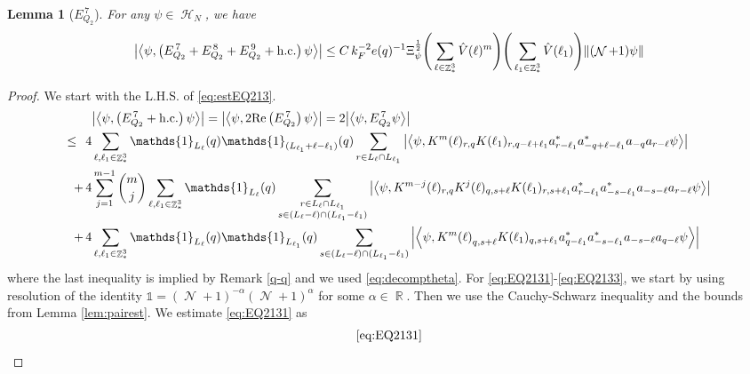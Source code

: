 \documentclass[sn-mathphys, Numbered ,a4paper]{sn-jnl}%
\DeclareMathOperator{\R}{\mathbb{R}}
\DeclareMathOperator{\Z}{\mathbb{Z}}
\DeclareMathOperator{\HH}{\mathcal{H}}
\DeclareMathOperator{\NN}{\mathcal{N}}
\newcommand{\half}{\frac{1}{2}}
\newcommand{\eva}[1]{\left\langle #1 \right\rangle}
\theoremstyle{plain}
\newtheorem{lemma}[theorem]{Lemma}
\theoremstyle{definition}
\theoremstyle{remark}
\theoremstyle{plain}
\theoremstyle{definition}
\theoremstyle{remark}
\begin{document}
\begin{lemma}[$E_{Q_2}^{\,7}$]\label{lem:EQ213}
	For any $\psi \in \HH_N$, we have
	\begin{equation}
		\abs{\eva{\psi,\left(E^{\,7}_{Q_2}+E^{\,8}_{Q_2}+E^{\,9}_{Q_2}+\mathrm{h.c.}\right) \psi }} 
		\leq  C\, k_{F}^{-2} e(q)^{-1} \Xi_{\psi}^{\half} \Bigg(\sum\limits_{\ell \in \Z^3_*} \hat{V}(\ell)^m \Bigg) \Bigg( \sum\limits_{\ell_1 \in \Z^3_*}\hat{V}(\ell_1) \Bigg)  \norm { (\NN+1) \psi }    \label{eq:estEQ213}
	\end{equation}
\end{lemma}
\begin{proof}
	We start with the L.H.S. of \eqref{eq:estEQ213}.
	\begin{align}
		&\abs{\eva{\psi,\left(E^{\,7}_{Q_2}+\mathrm{h.c.}\right) \psi }} = \abs{\eva{\psi,2\mathrm{Re}\left(E^{\,7}_{Q_2}\right) \psi }} = 2\abs{\eva{\psi, E^{\,7}_{Q_2} \psi }}\nonumber\\
		\leq\,\;4& \sum\limits_{\ell, \ell_1\in \Z^3_*} \mathds{1}_{L_{\ell}}(q) \mathds{1}_{(L_{\ell_1}+\ell-\ell_1)}(q) \sum\limits_{r\in L_{\ell} \cap L_{\ell_1}} \abs{\eva{\psi, K^m(\ell)_{r,q}K(\ell_1)_{r,q-\ell+\ell_1}a^*_{r-\ell_1}a^*_{-q+\ell-\ell_1} a_{-q}a_{r-\ell} \psi }}\label{eq:EQ2131}\\
		+\,4& \sum\limits_{j=1}^{m-1} {{m}\choose j} \sum\limits_{\ell, \ell_1\in \Z^3_*}\mathds{1}_{L_{\ell}}(q) \sum\limits_{\substack{r\in L_{\ell} \cap L_{\ell_1}\\ s \in (L_{\ell}-\ell) \cap (L_{\ell_1}-\ell_1)}}  \abs{\eva{\psi, K^{m-j}(\ell)_{r,q} K^{j}(\ell)_{q,s+\ell} K(\ell_1)_{r,s+\ell_1}a^*_{r-\ell_1}a^*_{-s-\ell_1} a_{-s-\ell}a_{r-\ell}  \psi }}\label{eq:EQ2132}\\
		+\,4&\sum\limits_{\ell, \ell_1\in \Z^3_*} \mathds{1}_{L_{\ell}}(q) \mathds{1}_{L_{\ell_1}}(q) \sum\limits_{ s \in (L_{\ell}-\ell) \cap (L_{\ell_1}-\ell_1)} \abs{\eva{\psi, K^m{(\ell)}_{q,s+\ell} K(\ell_1)_{q,s+\ell_1} a^*_{q-\ell_1} a^*_{-s-\ell_1} a_{-s-\ell} a_{q-\ell} \psi }}\label{eq:EQ2133}
	\end{align}
	where the last inequality is implied by Remark \ref{q-q} and we used \eqref{eq:decomptheta}.
	For \eqref{eq:EQ2131}-\eqref{eq:EQ2133}, we start by using resolution of the identity $\mathds{1} = (\NN+1)^{-\alpha}(\NN+1)^{\alpha}$ for some $\alpha \in \R$. Then we use the Cauchy-Schwarz inequality and the bounds from Lemma \ref{lem:pairest}.
	We estimate \eqref{eq:EQ2131} as
	\begin{alignat}{2}
		&\eqref{eq:EQ2131}\nonumber\\

\end{alignat}
\end{proof}
\end{document}
